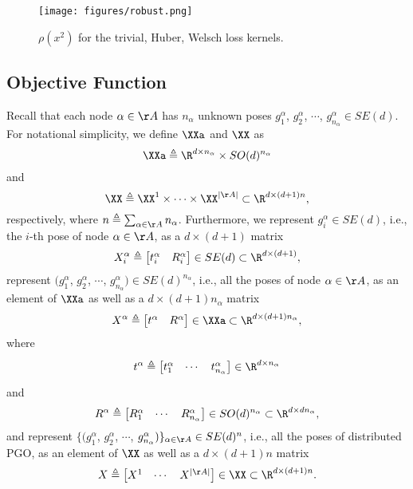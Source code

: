 \begin{figure}
	\centering
	\texttt{[image: figures/robust.png]}
	\caption{$\rho(x^2)$ for the trivial, Huber, Welsch loss kernels.}\label{fig::robust_loss}
	\vspace{-1em}
\end{figure}

\vspace{-0.5em}
\subsection{Objective Function}
Recall that each node $\alpha\in\AA$ has $n_\alpha$ unknown poses $g_{1}^\alpha$, $g_{2}^\alpha$, $\cdots$, $g_{n_\alpha}^\alpha\in SE(d)$. For notational simplicity, we define $\XXa$ and $\XX$ as
\begin{equation}
\nonumber
\XXa\triangleq \R^{d\times n_\alpha}\times SO(d)^{n_\alpha}
\end{equation}
and
\begin{equation}
	\nonumber
	\XX \triangleq  \XX^1\times\cdots\times \XX^{|\AA|} \subset \R^{d\times (d+1)n},
\end{equation}
respectively, where $n\triangleq\sum_{\alpha\in\AA} n_\alpha$. Furthermore, we represent $g_i^\alpha\in SE(d)$, i.e., the $i$-th pose of node $\alpha\in\AA$, as a $d\times(d+1)$ matrix
\begin{equation}\label{eq::Xai}
	X_i^\alpha \triangleq \begin{bmatrix}
		t_i^\alpha & R_i^\alpha
	\end{bmatrix}\in SE(d)\subset \R^{d\times(d+1)},
\end{equation}
represent $(g_{1}^\alpha$, $g_{2}^\alpha$, $\cdots$, $g_{n_\alpha}^\alpha)\in SE(d)^{n_\alpha}$, i.e., all the poses of node $\alpha\in\AA$, as an element of $\XXa$ as well as a $d\times (d+1)n_\alpha$ matrix
\begin{equation}\label{eq::Xa}
	X^\alpha\triangleq \begin{bmatrix}
		t^\alpha & R^\alpha
	\end{bmatrix}\in \XXa \subset \R^{d\times (d+1)n_\alpha},
\end{equation}
where
$$
\vphantom{\Big\{}t^\alpha\triangleq\begin{bmatrix}
	t_1^\alpha & \cdots & t_{n_\alpha}^\alpha
\end{bmatrix}\in \R^{d\times n_\alpha}
$$
and
$$
R^\alpha\triangleq\begin{bmatrix}
	R_1^\alpha & \cdots & R_{n_\alpha}^\alpha
\end{bmatrix}\in SO(d)^{n_\alpha}\subset\R^{d\times dn_\alpha},
$$
and represent $\{(g_{1}^\alpha$, $g_{2}^\alpha$, $\cdots$, $g_{n_\alpha}^\alpha)\}_{\alpha\in\AA}\in SE(d)^{n}$, i.e., all the poses of distributed PGO, as an element of $\XX$ as well as a $d\times(d+1)n$ matrix
\begin{equation}\label{eq::Xall}
	X\triangleq\begin{bmatrix}
		X^1 & \cdots & X^{|\AA|}
	\end{bmatrix}\in \XX\subset \R^{d\times(d+1)n}.
\end{equation}

